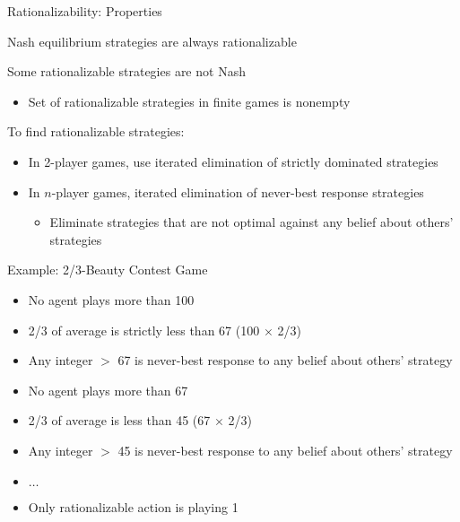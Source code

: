 \documentclass[11pt,aspectratio=169,handout]{beamer}
\begin{document}
  \begin{frame}{Rationalizability: Properties}
   \begin{itemizes}
    \item Nash equilibrium strategies are always rationalizable
    \item<+-> Some rationalizable strategies are not Nash
    \begin{itemize}
     \item Set of rationalizable strategies in finite games is nonempty
    \end{itemize}
    \item<+-> To find rationalizable strategies:
    \begin{itemize}
     \setlength{\itemsep}{1.1em}
     \item<+-> In \alert{2-player} games, use iterated elimination of strictly dominated strategies
     \item<+-> In \alert{$n$-player} games, iterated elimination of \alert{never-best response} strategies
     \begin{itemize}
      \item Eliminate strategies that are not optimal against any belief about others' strategies
     \end{itemize}
    \end{itemize}
   \end{itemizes}
  \end{frame}
  
  \begin{frame}{Example: 2/3-Beauty Contest Game}
   \begin{itemize}[<+->]
    \item No agent plays more than 100
    \item 2/3 of average is strictly less than 67 (100 $\times$ 2/3)
    \item Any integer $>$ 67 is never-best response to any belief about others' strategy
    \item No agent plays more than 67
    \item 2/3 of average is less than 45 (67 $\times$ 2/3)
    \item Any integer $>$ 45 is never-best response to any belief about others' strategy
    \item $\dots$
    \item Only rationalizable action is playing 1
   \end{itemize}
  \end{frame}
 
\end{document}
